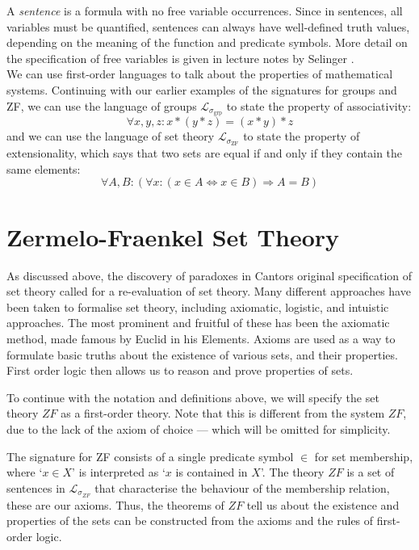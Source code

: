 \documentclass[11pt]{report}
\theoremstyle{definition}
\theoremstyle{theorem}
\theoremstyle{lemma}
\begin{document}
A \emph{sentence} is a formula with no free variable occurrences.
Since in sentences, all variables must be quantified, sentences can always have well-defined truth values, depending on the meaning of the function and predicate symbols.
More detail on the specification of free variables is given in lecture notes by Selinger \cite[ch.~1.9]{selinger}.\\

\noindent
We can use first-order languages to talk about the properties of mathematical systems.
Continuing with our earlier examples of the signatures for groups and ZF, we can use the language of groups $\mathcal{L}_{\sigma_{\text{grp}}}$ to state the property of associativity:
$$\forall x,y,z: x*(y*z) = (x*y)*z$$
and we can use the language of set theory $\mathcal{L}_{\sigma_{\text{ZF}}}$ to state the property of extensionality, which says that two sets are equal if and only if they contain the same elements:
$$\forall A,B: (\forall x:(x\in A \Leftrightarrow x\in B) \Rightarrow A = B)$$

\section{Zermelo-Fraenkel Set Theory}
As discussed above, the discovery of paradoxes in Cantors original specification of set theory called for a re-evaluation of set theory.
Many different approaches have been taken to formalise set theory, including axiomatic, logistic, and intuistic approaches.
The most prominent and fruitful of these has been the axiomatic method, made famous by Euclid in his Elements.
Axioms are used as a way to formulate basic truths about the existence of various sets, and their properties.
First order logic then allows us to reason and prove properties of sets.

To continue with the notation and definitions above, we will specify the set theory $\mathit{ZF}$ as a first-order theory.
Note that this is different from the system $\mathit{ZF}$, due to the lack of the axiom of choice --- which will be omitted for simplicity.

The signature for ZF consists of a single predicate symbol $\in$ for set membership, where `$x \in X$' is interpreted as `$x$ is contained in $X$'.
The theory $\mathit{ZF}$ is a set of sentences in $\mathcal{L}_{\sigma_{\mathit{ZF}}}$ that characterise the behaviour of the membership relation, these are our axioms.
Thus, the theorems of $\mathit{ZF}$ tell us about the existence and properties of the sets can be constructed from the axioms and the rules of first-order logic.\\
\end{document}

